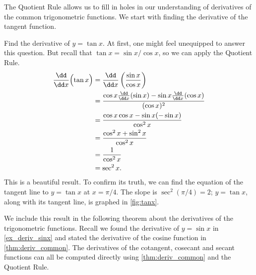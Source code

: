 The Quotient Rule allows us to fill in holes in our understanding of derivatives of the common trigonometric functions. We start with finding the derivative of the tangent function.

\begin{example}\label{ex_der_tan}
Find the derivative of $y=\tan x$.
\solution
At first, one might feel unequipped to answer this question. But recall that $\tan x = \sin x/\cos x$, so we can apply the Quotient Rule.
\begin{align*}
	\frac{\dd}{\dd x}\Bigl(\tan x\Bigr)
	&= \frac{\dd}{\dd x}\left(\frac{\sin x}{\cos x}\right) \\
	& = \frac{\cos x\frac{\dd}{\dd x}(\sin x)-\sin x\frac{\dd}{\dd x}(\cos x)}{(\cos x)^2} \\
	&= \frac{\cos x \cos x - \sin x (-\sin x)}{\cos^2 x} \\
	&= \frac{\cos^2x+\sin^2x}{\cos^2x}\\
	&= \frac{1}{\cos^2x} \\
	&= \sec ^2 x.
\end{align*}
This is a beautiful result. To confirm its truth, we can find the equation of the tangent line to $y=\tan x$ at $x=\pi/4$. The slope is $\sec^2(\pi/4) = 2$; $y=\tan x$, along with its tangent line, is graphed in \autoref{fig:tanx}.
\end{example}

We include this result in the following theorem about the derivatives of the trigonometric functions. Recall we found the derivative of $y=\sin x$ in \autoref{ex_deriv_sinx} and stated the derivative of the cosine function in \autoref{thm:deriv_common}. The derivatives of the cotangent, cosecant and secant functions can all be computed directly using \autoref{thm:deriv_common} and the Quotient Rule.

